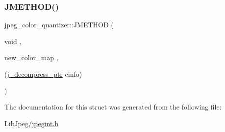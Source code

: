 \subsubsection{\texorpdfstring{JMETHOD()}{JMETHOD()}\hspace{0.1cm}{\footnotesize\ttfamily [4/4]}}
{\footnotesize\ttfamily jpeg\+\_\+color\+\_\+quantizer\+::\+J\+M\+E\+T\+H\+OD (\begin{DoxyParamCaption}\item[{void}]{,  }\item[{new\+\_\+color\+\_\+map}]{,  }\item[{(\mbox{\hyperlink{jpeglib_8h_a00c7d78af44bd26a901c791ccfc1e178}{j\+\_\+decompress\+\_\+ptr}} cinfo)}]{ }\end{DoxyParamCaption})}



The documentation for this struct was generated from the following file\+:\begin{DoxyCompactItemize}
\item 
Lib\+Jpeg/\mbox{\hyperlink{jpegint_8h}{jpegint.\+h}}\end{DoxyCompactItemize}
